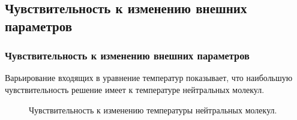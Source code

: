 \documentclass[9pt, apectratio=43,unicode]{beamer}
\begin{document}
\subsection{Чувствительность к изменению внешних параметров}
\begin{frame}\frametitle{Чувствительность к изменению внешних параметров}

Варьирование входящих в уравнение температур показывает, что наибольшую чувствительность решение имеет к температуре нейтральных молекул.

\begin{figure}
\caption{Чувствительность к изменению температуры нейтральных молекул.}
\end{figure}

\end{frame}
\end{document}
